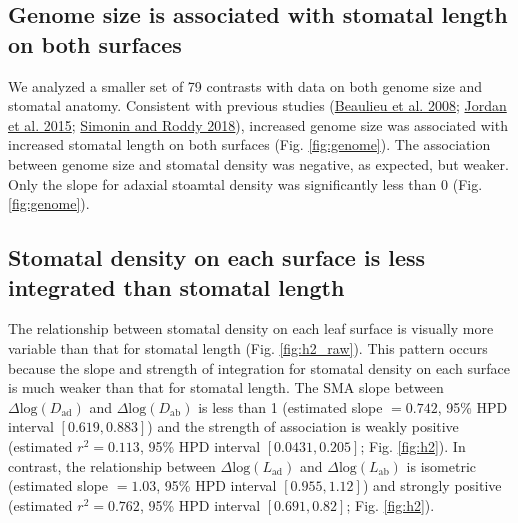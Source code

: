 \documentclass[
  12pt,
]{article}
\begin{document}
\hypertarget{genome-size-is-associated-with-stomatal-length-on-both-surfaces}{%
\subsection{Genome size is associated with stomatal length on both surfaces}\label{genome-size-is-associated-with-stomatal-length-on-both-surfaces}}

We analyzed a smaller set of 79 contrasts with data on both genome size and stomatal anatomy. Consistent with previous studies (\protect\hyperlink{ref-beaulieu_genome_2008}{Beaulieu et al. 2008}; \protect\hyperlink{ref-jordan_environmental_2015}{Jordan et al. 2015}; \protect\hyperlink{ref-simonin_genome_2018}{Simonin and Roddy 2018}), increased genome size was associated with increased stomatal length on both surfaces (Fig. \ref{fig:genome}). The association between genome size and stomatal density was negative, as expected, but weaker. Only the slope for adaxial stoamtal density was significantly less than 0 (Fig. \ref{fig:genome}).

\hypertarget{stomatal-density-on-each-surface-is-less-integrated-than-stomatal-length}{%
\subsection{Stomatal density on each surface is less integrated than stomatal length}\label{stomatal-density-on-each-surface-is-less-integrated-than-stomatal-length}}

The relationship between stomatal density on each leaf surface is visually more variable than that for stomatal length (Fig. \ref{fig:h2_raw}). This pattern occurs because the slope and strength of integration for stomatal density on each surface is much weaker than that for stomatal length. The SMA slope between \(\Delta \text{log}(D_\text{ad})\) and \(\Delta \text{log}(D_\text{ab})\) is less than 1 (estimated slope \(= 0.742\), 95\% HPD interval \([0.619,0.883]\)) and the strength of association is weakly positive (estimated \(r^2 = 0.113\), 95\% HPD interval \([0.0431,0.205]\); Fig. \ref{fig:h2}). In contrast, the relationship between \(\Delta \text{log}(L_\text{ad})\) and \(\Delta \text{log}(L_\text{ab})\) is isometric (estimated slope \(= 1.03\), 95\% HPD interval \([0.955,1.12]\)) and strongly positive (estimated \(r^2 = 0.762\), 95\% HPD interval \([0.691,0.82]\); Fig. \ref{fig:h2}).
\end{document}
